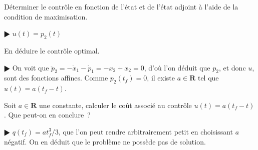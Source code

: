 \documentclass[11pt,a4paper]{article}
\def\R{\mathbf{R}}
\theoremstyle{plain}
\theoremstyle{definition}
\begin{document}
\begin{Exercice}[8 points]
\begin{Question} D\'eterminer le contr\^ole en fonction de l'\'etat et de l'\'etat
adjoint \`a l'aide de la condition de maximisation.
\end{Question}
\begin{corr} $\RHD$ $u(t)=p_2(t)$
\end{corr}

\begin{Question} En d\'eduire le contr\^ole optimal.
\end{Question}
\begin{corr} $\RHD$ On voit que $\ddot{p}_2=-\dot{x}_1-\dot{p}_1=-x_2+x_2=0$, d'o\`u
l'on d\'eduit que $p_2$, et donc $u$, sont des fonctions affines. Comme $p_2(t_f)=0$, il
existe $a \in \R$ tel que $u(t)=a(t_f-t)$.
\end{corr}

\begin{Question} Soit $a \in \R$ une constante, calculer le co\^ut associ\'e au
contr\^ole $u(t)=a(t_f-t)$. Que peut-on en conclure~?
\end{Question}
\begin{corr} $\RHD$ $q(t_f)=at_f^3/3$, que l'on peut rendre arbitrairement petit en
choisissant $a$ n\'egatif. On en d\'eduit que le probl\`eme ne poss\`ede pas de
solution.
\end{corr}

\end{Exercice}
\end{document}
